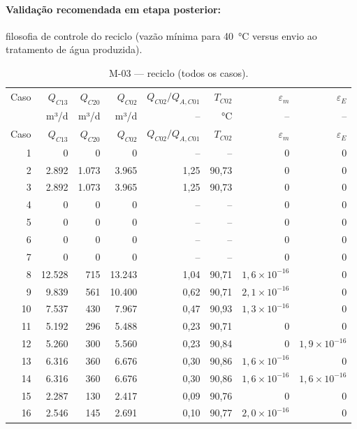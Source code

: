 \documentclass[11pt,a4paper]{article}
\numberwithin{equation}{section}
\numberwithin{table}{section}
\numberwithin{figure}{section}
\begin{document}
\paragraph{Validação recomendada em etapa posterior:} filosofia de controle do reciclo (vazão mínima para 40~\si{\celsius} versus envio ao tratamento de água produzida).
{\footnotesize\setlength{\tabcolsep}{3.5pt}\begin{longtable}{rrrrrrrr}
\caption{M-03 --- reciclo (todos os casos).\label{tab:b13}}\\\toprule
Caso & $Q_{C13}$ & $Q_{C20}$ & $Q_{C02}$ & $Q_{C02}/Q_{A,C01}$ & $T_{C02}$ & $\varepsilon_m$ & $\varepsilon_E$\\
 & m³/d & m³/d & m³/d & -- & °C & -- & --\\\midrule\endfirsthead
\toprule Caso & $Q_{C13}$ & $Q_{C20}$ & $Q_{C02}$ & $Q_{C02}/Q_{A,C01}$ & $T_{C02}$ & $\varepsilon_m$ & $\varepsilon_E$\\\midrule\endhead
1 & 0 & 0 & 0 & -- & -- & $0$ & $0$\\
2 & 2.892 & 1.073 & 3.965 & 1,25 & 90,73 & $0$ & $0$\\
3 & 2.892 & 1.073 & 3.965 & 1,25 & 90,73 & $0$ & $0$\\
4 & 0 & 0 & 0 & -- & -- & $0$ & $0$\\
5 & 0 & 0 & 0 & -- & -- & $0$ & $0$\\
6 & 0 & 0 & 0 & -- & -- & $0$ & $0$\\
7 & 0 & 0 & 0 & -- & -- & $0$ & $0$\\
8 & 12.528 & 715 & 13.243 & 1,04 & 90,71 & $1{,}6\times10^{-16}$ & $0$\\
9 & 9.839 & 561 & 10.400 & 0,62 & 90,71 & $2{,}1\times10^{-16}$ & $0$\\
10 & 7.537 & 430 & 7.967 & 0,47 & 90,93 & $1{,}3\times10^{-16}$ & $0$\\
11 & 5.192 & 296 & 5.488 & 0,23 & 90,71 & $0$ & $0$\\
12 & 5.260 & 300 & 5.560 & 0,23 & 90,84 & $0$ & $1{,}9\times10^{-16}$\\
13 & 6.316 & 360 & 6.676 & 0,30 & 90,86 & $1{,}6\times10^{-16}$ & $0$\\
14 & 6.316 & 360 & 6.676 & 0,30 & 90,86 & $1{,}6\times10^{-16}$ & $1{,}6\times10^{-16}$\\
15 & 2.287 & 130 & 2.417 & 0,09 & 90,76 & $0$ & $0$\\
16 & 2.546 & 145 & 2.691 & 0,10 & 90,77 & $2{,}0\times10^{-16}$ & $0$\\
\bottomrule\end{longtable}}
\end{document}
